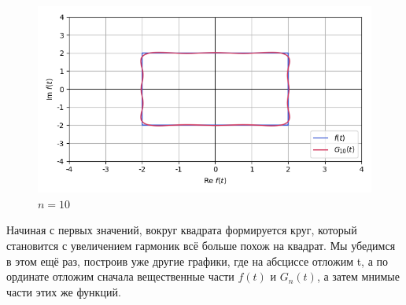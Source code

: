 \documentclass[a4paper]{article}
\begin{document}
\begin{figure}[H]
\begin{minipage}{0.5\textwidth}
        \caption{$n = 3$}
    \end{minipage}\hfill
    \begin{minipage}{0.5\textwidth}
        \centering \includegraphics[width=\textwidth]{parametric_func/10.png}
        \caption{$n = 10$}
    \end{minipage}
\end{figure}\noindent
Начиная с первых значений, вокруг квадрата формируется круг, который становится с увеличением гармоник всё больше похож на квадрат. Мы убедимся в этом ещё раз, построив уже другие графики, где на абсциссе отложим t, а по ординате отложим сначала вещественные части $f(t)$ и $G_n(t)$, а затем мнимые части этих же функций.
\end{document}
